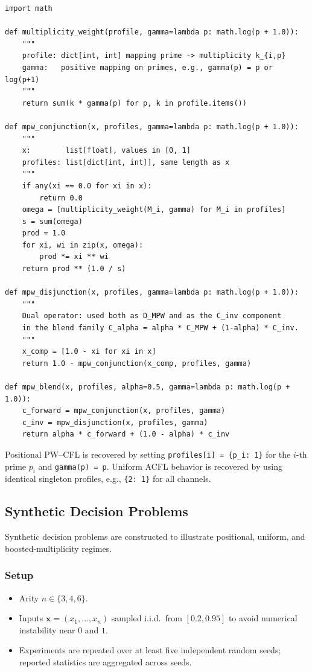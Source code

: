\documentclass[11pt]{article}
\begin{document}
\begin{verbatim}
import math

def multiplicity_weight(profile, gamma=lambda p: math.log(p + 1.0)):
    """
    profile: dict[int, int] mapping prime -> multiplicity k_{i,p}
    gamma:   positive mapping on primes, e.g., gamma(p) = p or log(p+1)
    """
    return sum(k * gamma(p) for p, k in profile.items())

def mpw_conjunction(x, profiles, gamma=lambda p: math.log(p + 1.0)):
    """
    x:        list[float], values in [0, 1]
    profiles: list[dict[int, int]], same length as x
    """
    if any(xi == 0.0 for xi in x):
        return 0.0
    omega = [multiplicity_weight(M_i, gamma) for M_i in profiles]
    s = sum(omega)
    prod = 1.0
    for xi, wi in zip(x, omega):
        prod *= xi ** wi
    return prod ** (1.0 / s)

def mpw_disjunction(x, profiles, gamma=lambda p: math.log(p + 1.0)):
    """
    Dual operator: used both as D_MPW and as the C_inv component
    in the blend family C_alpha = alpha * C_MPW + (1-alpha) * C_inv.
    """
    x_comp = [1.0 - xi for xi in x]
    return 1.0 - mpw_conjunction(x_comp, profiles, gamma)

def mpw_blend(x, profiles, alpha=0.5, gamma=lambda p: math.log(p + 1.0)):
    c_forward = mpw_conjunction(x, profiles, gamma)
    c_inv = mpw_disjunction(x, profiles, gamma)
    return alpha * c_forward + (1.0 - alpha) * c_inv
\end{verbatim}

Positional PW--CFL is recovered by setting \texttt{profiles[i] = \{p\_i: 1\}} for the $i$-th prime $p_i$ and \texttt{gamma(p) = p}. Uniform ACFL behavior is recovered by using identical singleton profiles, e.g., \texttt{\{2: 1\}} for all channels.

\subsection{Synthetic Decision Problems}
\label{subsec:synthetic}

Synthetic decision problems are constructed to illustrate positional, uniform, and boosted-multiplicity regimes.

\subsubsection{Setup}

\begin{itemize}
  \item Arity $n \in \{3,4,6\}$.
  \item Inputs $\mathbf{x} = (x_1,\dots,x_n)$ sampled i.i.d.\ from $[0.2, 0.95]$ to avoid numerical instability near $0$ and $1$.
  \item Experiments are repeated over at least five independent random seeds; reported statistics are aggregated across seeds.
\end{itemize}
\end{document}
